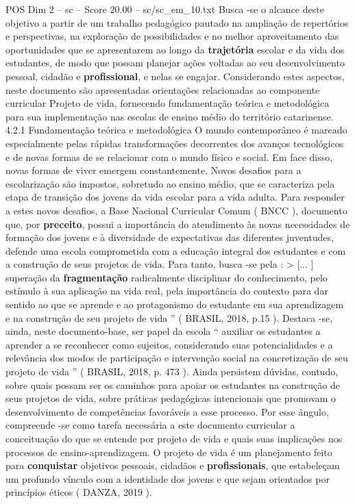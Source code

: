 \begin{textsample}{POS Dim 2 – sc – Score 20.00 – sc/sc\_em\_10.txt}
Busca -se o alcance deste objetivo a partir de um trabalho pedagógico pautado na ampliação de repertórios e perspectivas, na exploração de possibilidades e no melhor aproveitamento das oportunidades que se apresentarem ao longo da \textbf{trajetória} escolar e da vida dos estudantes, de modo que possam planejar ações voltadas ao seu desenvolvimento pessoal, cidadão e \textbf{profissional}, e nelas se engajar.
Considerando estes aspectos, neste documento são apresentadas orientações relacionadas ao componente curricular Projeto de vida, fornecendo fundamentação teórica e metodológica para sua implementação nas escolas de ensino médio do território catarinense. 4.2.1 Fundamentação teórica e metodológica O mundo contemporâneo é marcado especialmente pelas rápidas transformações decorrentes dos avanços tecnológicos e de novas formas de se relacionar com o mundo físico e social.
Em face disso, novas formas de viver emergem constantemente.
Novos desafios para a escolarização são impostos, sobretudo ao ensino médio, que se caracteriza pela etapa de transição dos jovens da vida escolar para a vida adulta.
Para responder a estes novos desafios, a Base Nacional Curricular Comum ( BNCC ), documento que, por \textbf{preceito}, possui a importância do atendimento às novas necessidades de formação dos jovens e à diversidade de expectativas das diferentes juventudes, defende uma escola comprometida com a educação integral dos estudantes e com a construção de seus projetos de vida.
Para tanto, busca -se pela : > [... ] superação da \textbf{fragmentação} radicalmente disciplinar do conhecimento, pelo estímulo à sua aplicação na vida real, pela importância do contexto para dar sentido ao que se aprende e ao protagonismo do estudante em sua aprendizagem e na construção de seu projeto de vida ” ( BRASIL, 2018, p.15 ).
Destaca -se, ainda, neste documento-base, ser papel da escola “ auxiliar os estudantes a aprender a se reconhecer como sujeitos, considerando suas potencialidades e a relevância dos modos de participação e intervenção social na concretização de seu projeto de vida ” ( BRASIL, 2018, p. 473 ).
Ainda persistem dúvidas, contudo, sobre quais possam ser os caminhos para apoiar os estudantes na construção de seus projetos de vida, sobre práticas pedagógicas intencionais que promovam o desenvolvimento de competências favoráveis a esse processo.
Por esse ângulo, compreende -se como tarefa necessária a este documento curricular a conceituação do que se entende por projeto de vida e quais suas implicações nos processos de ensino-aprendizagem.
O projeto de vida é um planejamento feito para \textbf{conquistar} objetivos pessoais, cidadãos e \textbf{profissionais}, que estabeleçam um profundo vínculo com a identidade dos jovens e que sejam orientados por princípios éticos ( DANZA, 2019 ).

\end{textsample}
